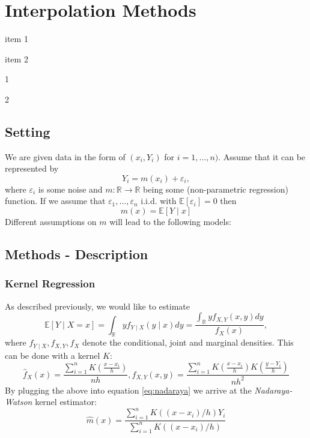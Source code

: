 \chapter{Interpolation Methods}

\begin{my_pros_cons_table}{
        \item item 1
        \item item 2

    }{
        \item 1
        \item 2
    }
\end{my_pros_cons_table}

\section{Setting}

We are given data in the form of $\left(x_{i}, Y_{i}\right)$ for $i=1, \ldots, n)$. Assume that it can be represented by
$$
    Y_{i}=m\left(x_{i}\right)+\varepsilon_{i},
$$
where $\varepsilon_i$ is some noise and $m: \mathbb{R} \rightarrow \mathbb{R}$ being some (non-parametric regression) function. If we assume that $\varepsilon_{1}, \ldots, \varepsilon_{n}$ i.i.d. with $\mathbb{E}\left[\varepsilon_{i}\right]=0$ then $$m(x)=\mathbb{E}[Y \mid x]$$
Different assumptions on $m$ will lead to the following models:



\section{Methods - Description}

\subsection{Kernel Regression}
\label{sec:Kernel}
As described previously, we would like to estimate
\begin{equation}
    \label{eq:nadaraya}
    \mathbb{E}[Y \mid X=x]
    = \int_{\mathbb{R}} y f_{Y \mid X}(y \mid x) d y
    =\frac{\int_{\mathbb{R}} y f_{X, Y}(x, y) d y}{f_{X}(x)},
\end{equation}
where $f_{Y \mid X}, f_{X, Y}, f_{X}$ denote the conditional, joint and marginal densities.
This can be done with a kernel $K$:
$$
    \hat{f}_{X}(x)=\frac{\sum_{i=1}^{n} K\left(\frac{x-x_{i}}{h}\right)}{n h}, \hat{f}_{X, Y}(x, y)=\frac{\sum_{i=1}^{n} K\left(\frac{x-x_{i}}{h}\right) K\left(\frac{y-Y_{i}}{h}\right)}{n h^{2}}
$$
By plugging the above into equation \ref{eq:nadaraya} we arrive at the \textit{Nadaraya-Watson} kernel estimator:
$$\hat{m}(x)=\frac{\sum_{i=1}^{n} K\left(\left(x-x_{i}\right) / h\right) Y_{i}}{\sum_{i=1}^{n} K\left(\left(x-x_{i}\right) / h\right)}$$

